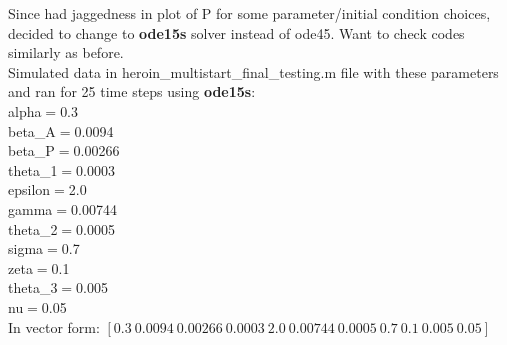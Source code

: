 \documentclass[12pt]{article}
\begin{document}
Since had jaggedness in plot of P for some parameter/initial condition choices, decided to change to \textbf{ode15s} solver instead of ode45. Want to check codes similarly as before. 
\\

Simulated data in heroin\_multistart\_final\_testing.m file with these parameters and ran for 25 time steps using \textbf{ode15s}: \\
alpha$=$0.3 \\
beta\_{A}$=$0.0094 \\
beta\_{P}$=$0.00266 \\
theta\_{1}$=$0.0003 \\
epsilon$=$2.0 \\
gamma$=$0.00744 \\
theta\_{2}$=$0.0005 \\
sigma$=$0.7 \\
zeta$=$0.1 \\
theta\_{3}$=$0.005 \\
nu$=$0.05 \\

In vector form: $[0.3 \ 0.0094 \ 0.00266 \ 0.0003 \ 2.0 \ 0.00744 \ 0.0005 \ 0.7 \ 0.1 \ 0.005 \ 0.05]$ \\
\end{document}
